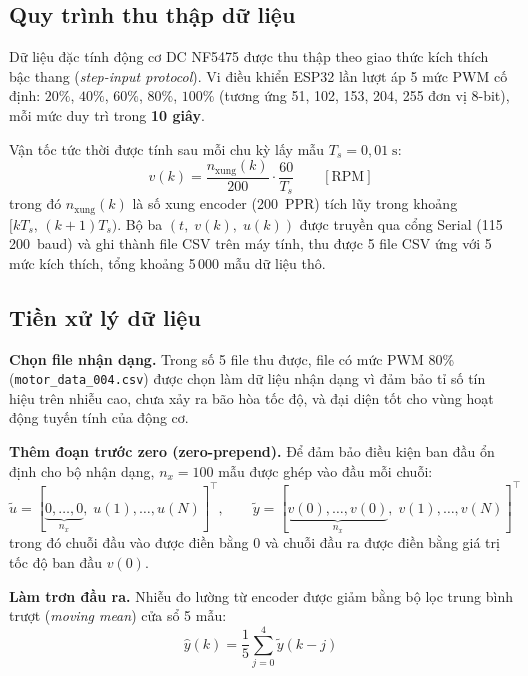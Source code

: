 \subsection{Quy trình thu thập dữ liệu}

Dữ liệu đặc tính động cơ DC NF5475 được thu thập theo giao thức kích thích
bậc thang (\textit{step-input protocol}). Vi điều khiển ESP32 lần lượt áp
5 mức PWM cố định: $20\%$, $40\%$, $60\%$, $80\%$, $100\%$ (tương ứng 51,
102, 153, 204, 255 đơn vị 8-bit), mỗi mức duy trì trong \textbf{10 giây}.

Vận tốc tức thời được tính sau mỗi chu kỳ lấy mẫu $T_s = 0{,}01\;\text{s}$:
\begin{equation}
    v(k) = \frac{n_{\text{xung}}(k)}{200} \cdot \frac{60}{T_s}
    \qquad [\text{RPM}]
    \label{eq:vel_calc}
\end{equation}
trong đó $n_{\text{xung}}(k)$ là số xung encoder (200~PPR) tích lũy trong
khoảng $[kT_s,\,(k{+}1)T_s)$. Bộ ba $(t,\;v(k),\;u(k))$ được truyền qua
cổng Serial (115\,200~baud) và ghi thành file CSV trên máy tính, thu được 5
file CSV ứng với 5 mức kích thích, tổng khoảng 5\,000 mẫu dữ liệu thô.

\subsection{Tiền xử lý dữ liệu}

\textbf{Chọn file nhận dạng.}
Trong số 5 file thu được, file có mức PWM 80\%
(\texttt{motor\_data\_004.csv}) được chọn làm dữ liệu nhận dạng vì đảm bảo
tỉ số tín hiệu trên nhiễu cao, chưa xảy ra bão hòa tốc độ, và đại diện tốt
cho vùng hoạt động tuyến tính của động cơ.

\textbf{Thêm đoạn trước zero (zero-prepend).}
Để đảm bảo điều kiện ban đầu ổn định cho bộ nhận dạng, $n_x = 100$ mẫu
được ghép vào đầu mỗi chuỗi:
\begin{equation}
    \tilde{u} = [\underbrace{0,\ldots,0}_{n_x},\; u(1),\ldots,u(N)]^{\!\top},
    \qquad
    \tilde{y} = [\underbrace{v(0),\ldots,v(0)}_{n_x},\; v(1),\ldots,v(N)]^{\!\top}
    \label{eq:zero_prepend}
\end{equation}
trong đó chuỗi đầu vào được điền bằng 0 và chuỗi đầu ra được điền bằng
giá trị tốc độ ban đầu $v(0)$.

\textbf{Làm trơn đầu ra.}
Nhiễu đo lường từ encoder được giảm bằng bộ lọc trung bình trượt
(\textit{moving mean}) cửa sổ 5 mẫu:
\begin{equation}
    \hat{y}(k) = \frac{1}{5}\sum_{j=0}^{4} \tilde{y}(k-j)
    \label{eq:smooth}
\end{equation}


